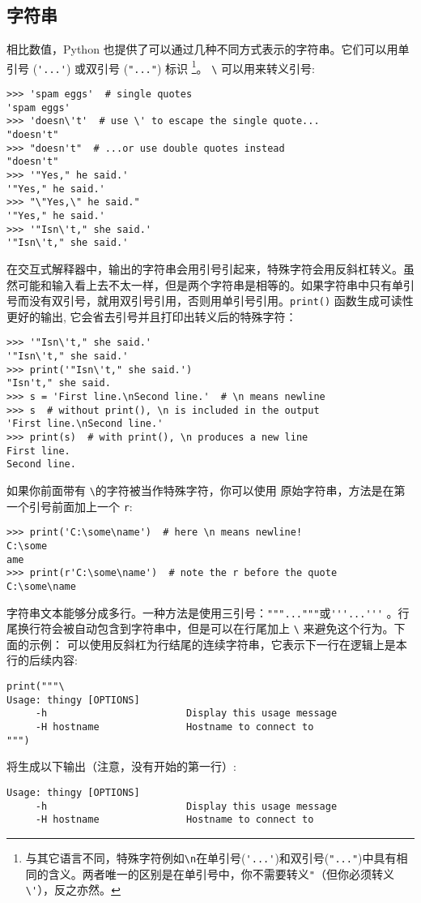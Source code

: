\subsection{字符串}
相比数值，Python 也提供了可以通过几种不同方式表示的字符串。它们可以用单引号 (\verb|'...'|) 或双引号 (\verb|"..."|) 标识 \cprotect\footnote{与其它语言不同，特殊字符例如\verb|\n|在单引号(\verb|'...'|)和双引号(\verb|"..."|)中具有相同的含义。两者唯一的区别是在单引号中，你不需要转义\verb|"|（但你必须转义  \verb|\'|），反之亦然。}。
\verb|\| 可以用来转义引号:
\begin{lstlisting}
>>> 'spam eggs'  # single quotes
'spam eggs'
>>> 'doesn\'t'  # use \' to escape the single quote...
"doesn't"
>>> "doesn't"  # ...or use double quotes instead
"doesn't"
>>> '"Yes," he said.'
'"Yes," he said.'
>>> "\"Yes,\" he said."
'"Yes," he said.'
>>> '"Isn\'t," she said.'
'"Isn\'t," she said.'
\end{lstlisting}
在交互式解释器中，输出的字符串会用引号引起来，特殊字符会用反斜杠转义。虽然可能和输入看上去不太一样，但是两个字符串是相等的。如果字符串中只有单引号而没有双引号，就用双引号引用，否则用单引号引用。\texttt{print()} 函数生成可读性更好的输出, 它会省去引号并且打印出转义后的特殊字符：
\begin{lstlisting}
>>> '"Isn\'t," she said.'
'"Isn\'t," she said.'
>>> print('"Isn\'t," she said.')
"Isn't," she said.
>>> s = 'First line.\nSecond line.'  # \n means newline
>>> s  # without print(), \n is included in the output
'First line.\nSecond line.'
>>> print(s)  # with print(), \n produces a new line
First line.
Second line.
\end{lstlisting}

如果你前面带有 \verb|\|的字符被当作特殊字符，你可以使用 原始字符串，方法是在第一个引号前面加上一个 \verb|r|:
\begin{lstlisting}
>>> print('C:\some\name')  # here \n means newline!
C:\some
ame
>>> print(r'C:\some\name')  # note the r before the quote
C:\some\name
\end{lstlisting}
字符串文本能够分成多行。一种方法是使用三引号：\verb|"""..."""|或\verb|'''...'''| 。行尾换行符会被自动包含到字符串中，但是可以在行尾加上 \verb|\| 来避免这个行为。下面的示例： 可以使用反斜杠为行结尾的连续字符串，它表示下一行在逻辑上是本行的后续内容:
\begin{lstlisting}
print("""\
Usage: thingy [OPTIONS]
     -h                        Display this usage message
     -H hostname               Hostname to connect to
""")
\end{lstlisting}
将生成以下输出（注意，没有开始的第一行）:
\begin{lstlisting}
Usage: thingy [OPTIONS]
     -h                        Display this usage message
     -H hostname               Hostname to connect to
\end{lstlisting}

